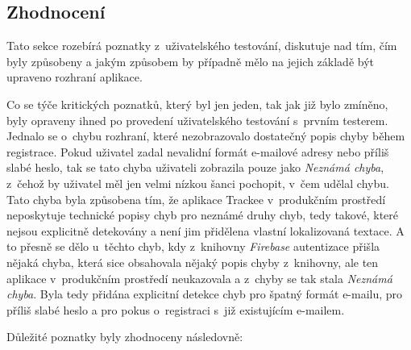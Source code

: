 \subsection{Zhodnocení}

Tato sekce rozebírá poznatky z~uživatelského testování, diskutuje nad tím, čím byly způsobeny a jakým způsobem by případně mělo na jejich základě být upraveno rozhraní aplikace.

Co se týče kritických poznatků, který byl jen jeden, tak jak již bylo zmíněno, byly opraveny ihned po provedení uživatelského testování s~prvním testerem. Jednalo se o~chybu rozhraní, které nezobrazovalo dostatečný popis chyby během registrace. Pokud uživatel zadal nevalidní formát e-mailové adresy nebo příliš slabé heslo, tak se tato chyba uživateli zobrazila pouze jako \emph{Neznámá chyba}, z~čehož by uživatel měl jen velmi nízkou šanci pochopit, v~čem udělal chybu. Tato chyba byla způsobena tím, že aplikace Trackee v~produkčním prostředí neposkytuje technické popisy chyb pro neznámé druhy chyb, tedy takové, které nejsou explicitně detekovány a není jim přidělena vlastní lokalizovaná textace. A to přesně se dělo u~těchto chyb, kdy z~knihovny \emph{Firebase} autentizace přišla nějaká chyba, která sice obsahovala nějaký popis chyby z~knihovny, ale ten aplikace v~produkčním prostředí neukazovala a z~chyby se tak stala \emph{Neznámá chyba}. Byla tedy přidána explicitní detekce chyb pro špatný formát e-mailu, pro příliš slabé heslo a pro pokus o~registraci s~již existujícím e-mailem.

Důležité poznatky byly zhodnoceny následovně:

